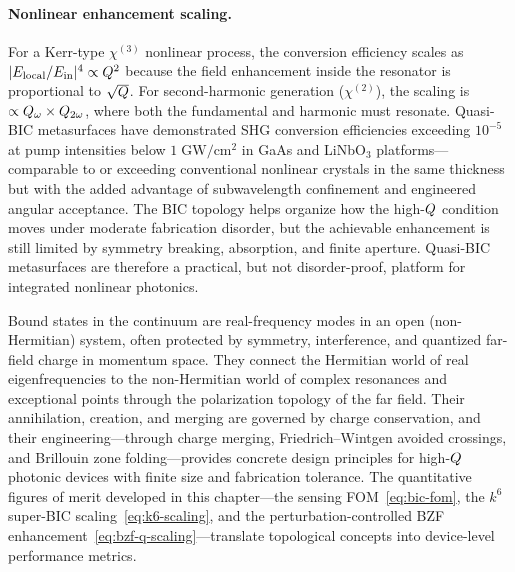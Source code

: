 \paragraph{Nonlinear enhancement scaling.}
For a Kerr-type $\chi^{(3)}$ nonlinear process, the conversion
efficiency scales as $|E_{\mathrm{local}}/E_{\mathrm{in}}|^4 \propto
Q^2$ because the field enhancement inside the resonator is
proportional to $\sqrt{Q}$. For second-harmonic generation
($\chi^{(2)}$), the scaling is $\propto Q_\omega \times
Q_{2\omega}$, where both the fundamental and harmonic must
resonate. Quasi-BIC metasurfaces have demonstrated SHG conversion
efficiencies exceeding $10^{-5}$ at pump intensities below
$1\;\mathrm{GW/cm^2}$ in GaAs and LiNbO$_3$ platforms---comparable
to or exceeding conventional nonlinear crystals in the same thickness
but with the added advantage of subwavelength confinement and
engineered angular acceptance. The BIC topology helps organize how the
high-$Q$ condition moves under moderate fabrication disorder, but
the achievable enhancement is still limited by symmetry breaking,
absorption, and finite aperture. Quasi-BIC metasurfaces are therefore a
practical, but not disorder-proof, platform for integrated nonlinear
photonics.

\begin{takeaway}
Bound states in the continuum are real-frequency modes in an open
(non-Hermitian) system, often protected by symmetry, interference, and
quantized far-field charge in momentum space. They connect the Hermitian
world of real eigenfrequencies to the non-Hermitian world of complex
resonances and exceptional points through the polarization topology of
the far field.
Their annihilation, creation, and merging are governed by charge
conservation, and their engineering---through charge merging,
Friedrich--Wintgen avoided crossings, and
Brillouin zone folding---provides concrete design principles for
high-$Q$ photonic devices with finite size and fabrication tolerance.
The quantitative figures of merit developed in this chapter---the sensing
FOM~\eqref{eq:bic-fom}, the $k^6$ super-BIC scaling~\eqref{eq:k6-scaling},
and the perturbation-controlled BZF
enhancement~\eqref{eq:bzf-q-scaling}---translate topological concepts
into device-level performance metrics.
\end{takeaway}
